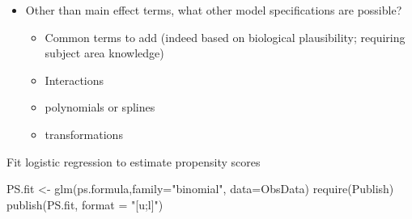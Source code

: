 \documentclass[
]{book}
\newenvironment{Shaded}{\begin{snugshade}}{\end{snugshade}}
\newcommand{\AttributeTok}[1]{\textcolor[rgb]{0.77,0.63,0.00}{#1}}
\newcommand{\FunctionTok}[1]{\textcolor[rgb]{0.00,0.00,0.00}{#1}}
\newcommand{\NormalTok}[1]{#1}
\newcommand{\OtherTok}[1]{\textcolor[rgb]{0.56,0.35,0.01}{#1}}
\newcommand{\StringTok}[1]{\textcolor[rgb]{0.31,0.60,0.02}{#1}}
\providecommand{\tightlist}{%
  \setlength{\itemsep}{0pt}\setlength{\parskip}{0pt}}
\begin{document}
\begin{itemize}
\tightlist
\item
  Other than main effect terms, what other model specifications are possible?

  \begin{itemize}
  \tightlist
  \item
    Common terms to add (indeed based on biological plausibility; requiring subject area knowledge)
  \item
    Interactions
  \item
    polynomials or splines
  \item
    transformations
  \end{itemize}
\end{itemize}

Fit logistic regression to estimate propensity scores

\begin{Shaded}
\begin{Highlighting}[]
\NormalTok{PS.fit }\OtherTok{\textless{}{-}} \FunctionTok{glm}\NormalTok{(ps.formula,}\AttributeTok{family=}\StringTok{"binomial"}\NormalTok{, }\AttributeTok{data=}\NormalTok{ObsData)}
\FunctionTok{require}\NormalTok{(Publish)}
\FunctionTok{publish}\NormalTok{(PS.fit,  }\AttributeTok{format =} \StringTok{"[u;l]"}\NormalTok{)}
\end{Highlighting}
\end{Shaded}
\end{document}
